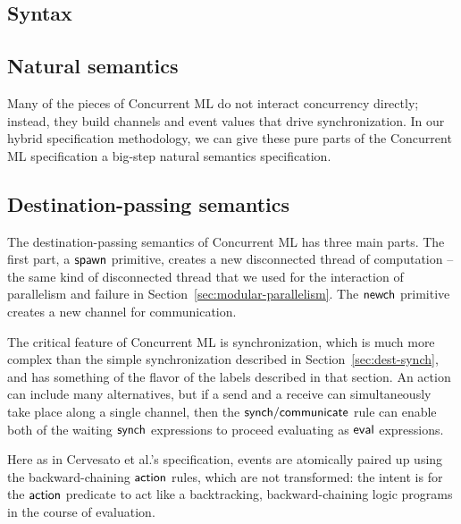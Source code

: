 \subsection{Syntax}


\subsection{Natural semantics}

Many of the pieces of Concurrent ML do not interact concurrency
directly; instead, they build channels and event values that drive
synchronization. In our hybrid specification methodology, we can give
these pure parts of the Concurrent ML specification a big-step
natural semantics specification.

\bigskip
{}

\subsection{Destination-passing semantics}

The destination-passing semantics of Concurrent ML has three main
parts.  The first part, a ${\sf spawn}$ primitive, creates a new
disconnected thread of computation -- the same kind of disconnected
thread that we used for the interaction of parallelism and failure in
Section~\ref{sec:modular-parallelism}. The ${\sf newch}$ primitive 
creates a new channel for communication.

\bigskip
{}
\bigskip

\noindent
The critical feature of Concurrent ML is synchronization, which is
much more complex than the simple synchronization described in
Section~\ref{sec:dest-synch}, and has something of the flavor of the
labels described in that section. An action can include many
alternatives, but if a send and a receive can simultaneously take
place along a single channel, then the ${\sf synch/communicate}$ rule
can enable both of the waiting ${\sf synch}$ expressions to proceed
evaluating as ${\sf eval}$ expressions.

Here as in Cervesato et al.'s specification, events are atomically
paired up using the backward-chaining ${\sf action}$ rules, which are
not transformed: the intent is for the ${\sf action}$ predicate to act 
like a backtracking, backward-chaining logic programs in the course
of evaluation.


